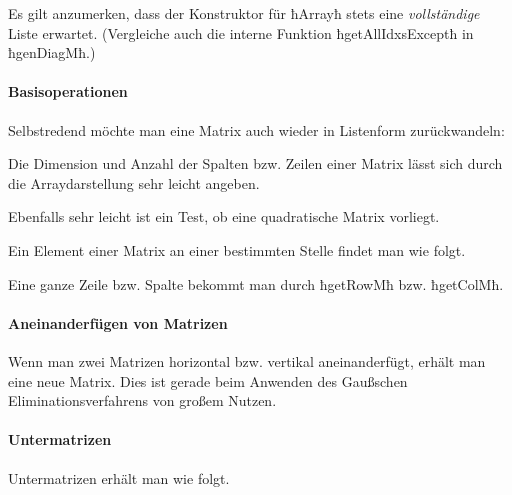 \begin{bemerkung}
  Es gilt anzumerken, dass der Konstruktor für ħArrayħ stets eine
  \emph{vollständige} Liste erwartet. (Vergleiche auch die interne Funktion
  ħgetAllIdxsExceptħ in ħgenDiagMħ.)
\end{bemerkung}

\paragraph{Basisoperationen} 
Selbstredend möchte man eine Matrix auch wieder in Listenform zurückwandeln:


Die Dimension und Anzahl der Spalten bzw. Zeilen  einer Matrix lässt 
sich durch die Arraydarstellung sehr leicht angeben.




Ebenfalls sehr leicht ist ein Test, ob eine quadratische
Matrix vorliegt.


Ein Element einer Matrix an einer bestimmten Stelle findet man wie folgt.


Eine ganze Zeile bzw. Spalte bekommt man durch ħgetRowMħ bzw. ħgetColMħ.


\paragraph{Aneinanderfügen von Matrizen} 
Wenn man zwei Matrizen horizontal bzw. vertikal aneinanderfügt, erhält man eine
neue Matrix. Dies ist gerade beim Anwenden des Gaußschen Eliminationsverfahrens
von großem Nutzen.


\paragraph{Untermatrizen} Untermatrizen erhält man wie folgt.


